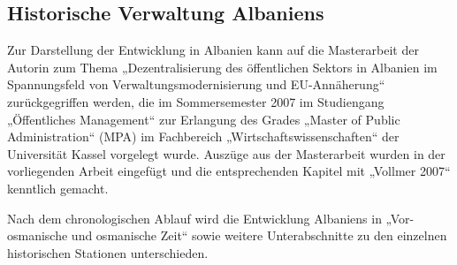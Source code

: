 \subsection{Historische Verwaltung Albaniens }
Zur Darstellung der Entwicklung in Albanien kann auf die Masterarbeit der Autorin zum Thema „Dezentralisierung des öffentlichen Sektors in Albanien im Spannungsfeld von Verwaltungsmodernisierung und EU-Annäherung“ zurückgegriffen werden, die im Sommersemester 2007 im Studiengang „Öffentliches Management“ zur Erlangung des Grades „Master of Public Administration“ (MPA) im Fachbereich „Wirtschaftswissenschaften“ der Universität Kassel vorgelegt wurde. Auszüge aus der Masterarbeit wurden in der vorliegenden Arbeit eingefügt und die entsprechenden Kapitel mit „Vollmer 2007“ kenntlich gemacht.\par
Nach dem chronologischen Ablauf wird die Entwicklung Albaniens in „Vor-osmanische und osmanische Zeit“ sowie weitere Unterabschnitte zu den einzelnen historischen Stationen unterschieden.
